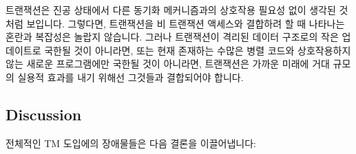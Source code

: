 트랜잭션은 진공 상태에서 다른 동기화 메커니즘과의 상호작용 필요성 없이 생각된
것처럼 보입니다.
그렇다면, 트랜잭션을 비 트랜잭션 액세스와 결합하려 할 때 나타나는 혼란과
복잡성은 놀랍지 않습니다.
그러나 트랜잭션이 격리된 데이터 구조로의 작은 업데이트로 국한될 것이 아니라면,
또는 현재 존재하는 수많은 병렬 코드와 상호작용하지 않는 새로운 프로그램에만
국한될 것이 아니라면, 트랜잭션은 가까운 미래에 거대 규모의 실용적 효과를 내기
위해선 그것들과 결합되어야 합니다.

\subsection{Discussion}
\label{sec:future:Discussion}

전체적인 TM 도입에의 장애물들은 다음 결론을 이끌어냅니다:

